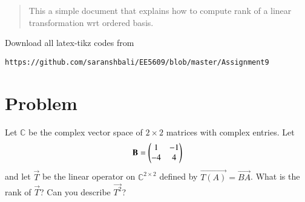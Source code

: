 \documentclass[journal,12pt,twocolumn]{IEEEtran}
\begin{document}
%
\begin{abstract}
This a simple document that explains how to compute rank of a linear transformation wrt ordered basis.
\end{abstract}
%
%
Download all latex-tikz codes from 
%
\begin{lstlisting}
https://github.com/saranshbali/EE5609/blob/master/Assignment9
\end{lstlisting}
%
\section{Problem}
Let $\mathbb{C}$ be the complex vector space of $2\times2$ matrices with complex entries. Let
\begin{align}
	\mathbf{B} = \begin{pmatrix}1 & -1 \\ -4 & 4\end{pmatrix}
\end{align}
and let $\vec{T}$ be the linear operator on $\mathbb{C}^{2\times2}$  defined by $\vec{T(A)} = \vec{BA}$. What is the rank of $\vec{T}$? Can you describe $\vec{T^2}$?   
\end{document}
